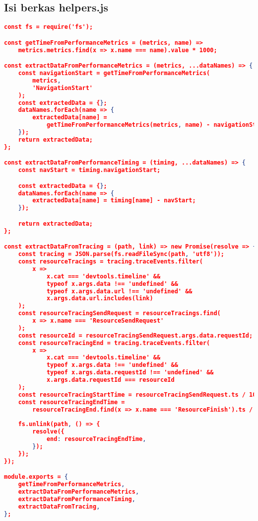 	\subsection*{Isi berkas helpers.js}
\begin{lstlisting}[frame=single,tabsize=2,breaklines,caption={Isi berkas helpers.js},label=helperjs, captionpos=b, language=json]
const fs = require('fs');

const getTimeFromPerformanceMetrics = (metrics, name) =>
	metrics.metrics.find(x => x.name === name).value * 1000;

const extractDataFromPerformanceMetrics = (metrics, ...dataNames) => {
	const navigationStart = getTimeFromPerformanceMetrics(
		metrics,
		'NavigationStart'
	);
	const extractedData = {};
	dataNames.forEach(name => {
		extractedData[name] =
			getTimeFromPerformanceMetrics(metrics, name) - navigationStart;
	});
	return extractedData;
};

const extractDataFromPerformanceTiming = (timing, ...dataNames) => {
	const navStart = timing.navigationStart;

	const extractedData = {};
	dataNames.forEach(name => {
		extractedData[name] = timing[name] - navStart;
	});

	return extractedData;
};

const extractDataFromTracing = (path, link) => new Promise(resolve => {
	const tracing = JSON.parse(fs.readFileSync(path, 'utf8'));
	const resourceTracings = tracing.traceEvents.filter(
		x =>
			x.cat === 'devtools.timeline' &&
			typeof x.args.data !== 'undefined' &&
			typeof x.args.data.url !== 'undefined' &&
			x.args.data.url.includes(link)
	);
	const resourceTracingSendRequest = resourceTracings.find(
		x => x.name === 'ResourceSendRequest'
	);
	const resourceId = resourceTracingSendRequest.args.data.requestId;
	const resourceTracingEnd = tracing.traceEvents.filter(
		x =>
			x.cat === 'devtools.timeline' &&
			typeof x.args.data !== 'undefined' &&
			typeof x.args.data.requestId !== 'undefined' &&
			x.args.data.requestId === resourceId
	);
	const resourceTracingStartTime = resourceTracingSendRequest.ts / 1000;
	const resourceTracingEndTime =
		resourceTracingEnd.find(x => x.name === 'ResourceFinish').ts / 1000;
	
	fs.unlink(path, () => {
		resolve({
			end: resourceTracingEndTime,
		});
	});
});

module.exports = {
	getTimeFromPerformanceMetrics,
	extractDataFromPerformanceMetrics,
	extractDataFromPerformanceTiming,
	extractDataFromTracing,
};
\end{lstlisting}

